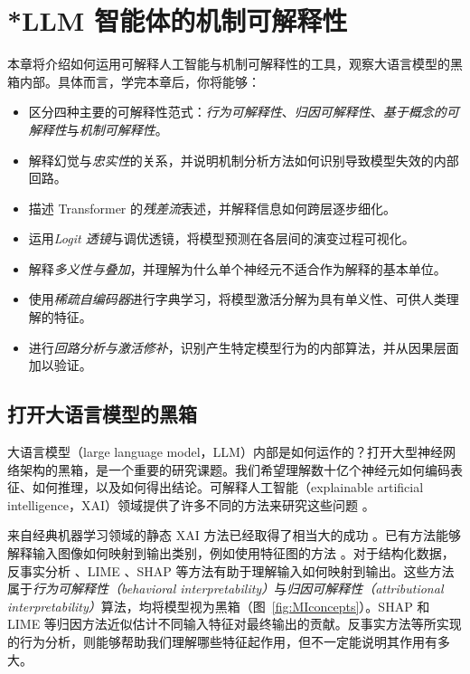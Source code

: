\chapter{*LLM 智能体的机制可解释性}\label{chap:mi}

\begin{learningbox}
本章将介绍如何运用可解释人工智能与机制可解释性的工具，观察大语言模型的黑箱内部。具体而言，学完本章后，你将能够：
\begin{itemize}[leftmargin=*, nosep]
    \item 区分四种主要的可解释性范式：\textit{行为可解释性}、\textit{归因可解释性}、\textit{基于概念的可解释性}与\textit{机制可解释性}。
    \item 解释幻觉与{\em 忠实性}的关系，并说明机制分析方法如何识别导致模型失效的内部回路。
    \item 描述 Transformer 的{\em 残差流}表述，并解释信息如何跨层逐步细化。
    \item 运用{\em Logit 透镜}与调优透镜，将模型预测在各层间的演变过程可视化。
    \item 解释{\em 多义性与叠加}，并理解为什么单个神经元不适合作为解释的基本单位。
    \item 使用{\em 稀疏自编码器}进行字典学习，将模型激活分解为具有单义性、可供人类理解的特征。
    \item 进行{\em 回路分析与激活修补}，识别产生特定模型行为的内部算法，并从因果层面加以验证。
\end{itemize}
\end{learningbox}

\section{打开大语言模型的黑箱}
大语言模型（large language model，LLM）内部是如何运作的？打开大型神经网络架构的黑箱，是一个重要的研究课题。我们希望理解数十亿个神经元如何编码表征、如何推理，以及如何得出结论。可解释人工智能（explainable artificial intelligence，XAI）领域提供了许多不同的方法来研究这些问题 \citep{minh2022explainable,rios2020feature,van2022comparison,selvaraju2017grad,ali2022xai}。

来自经典机器学习领域的静态 XAI 方法已经取得了相当大的成功 \citep{molnar2020interpretable}。已有方法能够解释输入图像如何映射到输出类别，例如使用特征图的方法 \citep{ren2016object,kohonen1982self,redmon2016you}。对于结构化数据，反事实分析 \citep{karimi2020model,explains24}、LIME \citep{ribeiro2016should}、SHAP \citep{lundberg2017unified} 等方法有助于理解输入如何映射到输出。这些方法属于\emph{行为可解释性（behavioral interpretability）}与\emph{归因可解释性（attributional interpretability）}算法，均将模型视为黑箱（图~\ref{fig:MIconcepts}）。SHAP 和 LIME 等归因方法近似估计不同输入特征对最终输出的贡献。反事实方法等所实现的行为分析，则能够帮助我们理解哪些特征起作用，但不一定能说明其作用有多大。

